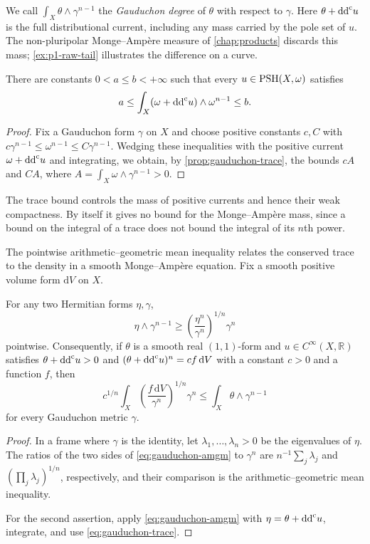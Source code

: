We call $\int_X\theta\wedge\gamma^{n-1}$ the \emph{Gauduchon degree} of $\theta$ with respect to $\gamma$. Here $\theta+\mathrm{dd}^{\mathrm{c}} u$ is the full distributional current, including any mass carried by the pole set of $u$. The non-pluripolar Monge--Amp\`ere measure of \cref{chap:products} discards this mass; \cref{ex:p1-raw-tail} illustrates the difference on a curve.

\begin{corollary}\label{cor:trace-bounds}
There are constants $0<a\leq b<+\infty$ such that every $u\in\mathrm{PSH}(X,\omega)$ satisfies
\[
 a\leq\int_X(\omega+\mathrm{dd}^{\mathrm{c}} u)\wedge\omega^{n-1}\leq b.
\]
\end{corollary}
\begin{proof}
Fix a Gauduchon form $\gamma$ on $X$ and choose positive constants $c,C$ with
$c\gamma^{n-1}\leq\omega^{n-1}\leq C\gamma^{n-1}$.
Wedging these inequalities with the positive current $\omega+\mathrm{dd}^{\mathrm{c}} u$ and integrating, we obtain, by \cref{prop:gauduchon-trace}, the bounds
$cA$ and $CA$, where $A=\int_X\omega\wedge\gamma^{n-1}>0$.
\end{proof}

The trace bound controls the mass of positive currents and hence their weak compactness. By itself it gives no bound for the Monge--Amp\`ere mass, since a bound on the integral of a trace does not bound the integral of its $n$th power.

The pointwise arithmetic--geometric mean inequality relates the conserved trace to the density in a smooth Monge--Amp\`ere equation. Fix a smooth positive volume form $\mathrm{d}V$ on $X$.

\begin{proposition}\label{prop:gauduchon-amgm}
For any two Hermitian forms $\eta,\gamma$,
\begin{equation}\label{eq:gauduchon-amgm}
 \eta\wedge\gamma^{n-1}
 \geq\left(\frac{\eta^n}{\gamma^n}\right)^{1/n}\gamma^n
\end{equation}
pointwise. Consequently, if $\theta$ is a smooth real $(1,1)$-form and $u\in C^\infty(X,\mathbb R)$ satisfies $\theta+\mathrm{dd}^{\mathrm{c}} u>0$ and $(\theta+\mathrm{dd}^{\mathrm{c}} u)^n=c f\,\mathrm{d}V$ with a constant $c>0$ and a function $f$, then
\begin{equation}\label{eq:gauduchon-c-bound}
 c^{1/n}
 \int_X\left(\frac{f\,\mathrm{d}V}{\gamma^n}\right)^{1/n}\gamma^n
 \leq\int_X\theta\wedge\gamma^{n-1}
\end{equation}
for every Gauduchon metric $\gamma$.
\end{proposition}
\begin{proof}
In a frame where $\gamma$ is the identity, let $\lambda_1,\ldots,\lambda_n>0$ be the eigenvalues of $\eta$. The ratios of the two sides of \eqref{eq:gauduchon-amgm} to $\gamma^n$ are
$n^{-1}\sum_j\lambda_j$ and $(\prod_j\lambda_j)^{1/n}$, respectively, and their comparison is the arithmetic--geometric mean inequality.

For the second assertion, apply \eqref{eq:gauduchon-amgm} with $\eta=\theta+\mathrm{dd}^{\mathrm{c}} u$, integrate, and use \eqref{eq:gauduchon-trace}.
\end{proof}

